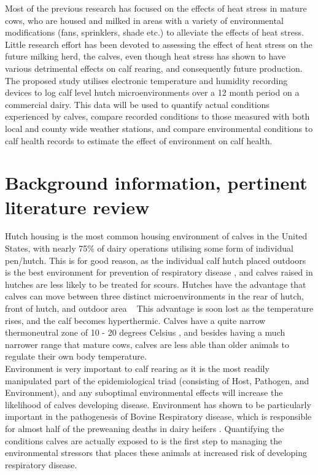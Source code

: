 \documentclass[12pt]{article}
\begin{document}
	Most of the previous research has focused on the effects of heat stress in mature cows, who are housed and milked in areas with a variety of environmental modifications (fans, sprinklers, shade etc.)  to alleviate the effects of heat stress.\cite{Armstrong1994}
	Little research effort has been devoted to assessing the effect of heat stress on the future milking herd, the calves, even though heat stress has shown to have various detrimental effects on calf rearing, and consequently future production. \cite{Stott1976,lacetera1994,Hoffman1997}\\


	The proposed study utilises electronic temperature and humidity recording devices to log calf level hutch microenvironments over a 12 month period on a commercial dairy. This data will be used to quantify actual conditions experienced by calves, compare recorded conditions to those measured with both local and county wide weather stations, and compare environmental conditions to calf health records to estimate the effect of environment on calf health. 

	\newpage
	\section{Background information, pertinent literature review}
	Hutch housing is the most common housing environment of calves in the United States, with nearly 75\% of dairy operations utilising some form of individual pen/hutch.\cite{NAHMS2007}
	This is for good reason, as the individual calf hutch placed outdoors is the best environment for prevention of respiratory disease \cite{callan2002biosecurity}, and calves raised in hutches are less likely to be treated for scours. \cite{Waltner-Toews1986}
	Hutches have the advantage that calves can move between three distinct microenvironments in the rear of hutch, front of hutch, and outdoor area ~\cite{brunsvold1985} 
	This advantage is soon lost as the temperature rises, and the calf becomes hyperthermic. Calves have a quite narrow thermoneutral zone of 10 - 20 degrees Celsius \cite{Gebremedhin1981}, and besides having a much narrower range that mature cows, calves are less able than older animals to regulate their own body temperature.\cite{Christopherson1976}\\


	Environment is very important to calf rearing as it is the most readily manipulated part of the epidemiological triad (consisting of Host, Pathogen, and Environment\cite{CDC2012}), and any suboptimal environmental effects will increase the likelihood of calves developing disease. 
	Environment has shown to be particularly important in the pathogenesis of Bovine Respiratory disease, \cite{Lago2006} which is responsible for almost half of the preweaning deaths in dairy heifers \cite{NAHMS2007}. 
	Quantifying the conditions calves are actually exposed to is the first step to managing the environmental stressors that places these animals at increased risk of developing respiratory disease. 
	
\end{document}
